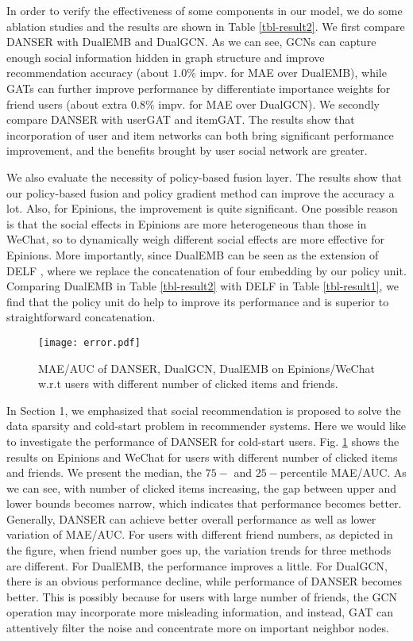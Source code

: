 \documentclass[sigconf]{acmart}
\begin{document}
In order to verify the effectiveness of some components in our model, we do some ablation studies and the results are shown in Table \ref{tbl-result2}. We first compare DANSER with DualEMB and DualGCN. As we can see, GCNs can capture enough social information hidden in graph structure and improve recommendation accuracy (about $1.0\%$ impv. for MAE over DualEMB), while GATs can further improve performance by differentiate importance weights for friend users (about extra $0.8\%$ impv. for MAE over DualGCN). We secondly compare DANSER with userGAT and itemGAT. The results show that incorporation of user and item networks can both bring significant performance improvement, and the benefits brought by user social network are greater.

We also evaluate the necessity of policy-based fusion layer. The results show that our policy-based fusion and policy gradient method can improve the accuracy a lot. Also, for Epinions, the improvement is quite significant. One possible reason is that the social effects in Epinions are more heterogeneous than those in WeChat, so to dynamically weigh different social effects are more effective for Epinions. More importantly, since DualEMB can be seen as the extension of DELF \cite{DELF}, where we replace the concatenation of four embedding by our policy unit. Comparing DualEMB in Table \ref{tbl-result2} with DELF in Table \ref{tbl-result1}, we find that the policy unit do help to improve its performance and is superior to straightforward concatenation.

\begin{figure}[h]
	\centering
	\texttt{[image: error.pdf]}
	\vspace{-5pt}
	\caption{MAE/AUC of DANSER, DualGCN, DualEMB on Epinions/WeChat w.r.t users with different number of clicked items and friends.}
	\label{fig-error}
	\vspace{-10pt}
\end{figure}

In Section 1, we emphasized that social recommendation is proposed to solve the data sparsity and cold-start problem in recommender systems. Here we would like to investigate the performance of DANSER for cold-start users. Fig. \ref{fig-error} shows the results on Epinions and WeChat for users with different number of clicked items and friends. We present the median, the $75-$ and $25-$percentile MAE/AUC. As we can see, with number of clicked items increasing, the gap between upper and lower bounds becomes narrow, which indicates that performance becomes better. Generally, DANSER can achieve better overall performance as well as lower variation of MAE/AUC. For users with different friend numbers, as depicted in the figure, when friend number goes up, the variation trends for three methods are different. For DualEMB, the performance improves a little. For DualGCN, there is an obvious performance decline, while performance of DANSER becomes better. This is possibly because for users with large number of friends, the GCN operation may incorporate more misleading information, and instead, GAT can attentively filter the noise and concentrate more on important neighbor nodes.
\end{document}
